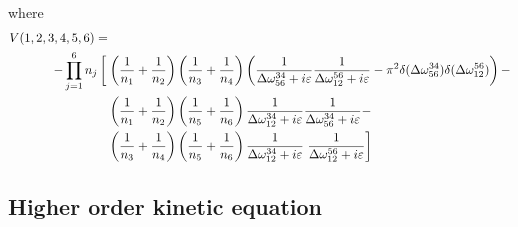 where 
\begin{equation}
    \begin{aligned}
        V(1,2,3,4,5,6) =&
        \\
        -\prod_{j=1}^{6}n_j\left[ \vphantom{\frac{1}{n_7}} \right.
        &\left( \frac{1}{n_1} +\frac{1}{n_2} \right) \left( \frac{1}{n_3} +\frac{1}{n_4} \right)
        \left( \frac{1}{\delomega^{34}_{56} + i\varepsilon}\frac{1}{\delomega^{56}_{12} + i\varepsilon} - \pi^2\delta(\delomega^{34}_{56})\delta(\delomega^{56}_{12})\right)-  
        \\
        &\left( \frac{1}{n_1} +\frac{1}{n_2} \right) \left( \frac{1}{n_5} +\frac{1}{n_6} \right)
        \frac{1}{\delomega^{34}_{12} + i\varepsilon}\frac{1}{\delomega^{34}_{56} + i\varepsilon} -
        \\
        &\left( \frac{1}{n_3} +\frac{1}{n_4} \right) \left( \frac{1}{n_5} +\frac{1}{n_6} \right)
        \frac{1}{\delomega^{34}_{12} + i\varepsilon}\left.\frac{1}{\delomega^{56}_{12} + i\varepsilon}
        \right]
    \end{aligned}
\end{equation}

\subsection{Higher order kinetic equation}

